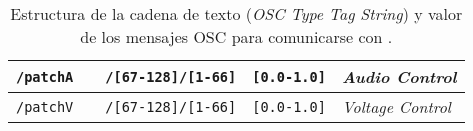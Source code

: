 \begin{table}
\begin{center}
\begin{tabular}{ l c l l l }
			\multirow{1}{*}{\texttt{/patchA}}	& 	
			& \texttt{/[67-128]/[1-66]} 	&\texttt{[0.0-1.0]} & \multirow{1}{*}{\textit{Audio Control}}\\
			\hline
			
			\multirow{1}{*}{\texttt{/patchV}}	& 	
			& \texttt{/[67-128]/[1-66]} 	&\texttt{[0.0-1.0]} & \multirow{1}{*}{\textit{Voltage Control}}\\
			\hline
			
		\end{tabular}
		\caption[Estructura de los mensajes OSC]{Estructura de la cadena de texto (\textit{OSC Type Tag String}) y valor de los mensajes OSC para comunicarse con \className.}
		\label{table:osc}
	\end{center}
\end{table}